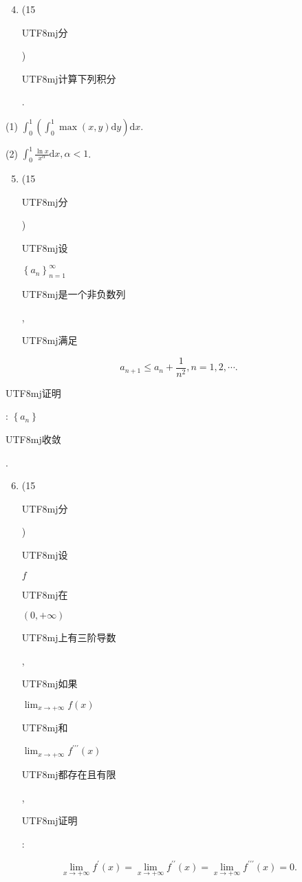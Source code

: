 \documentclass[10pt]{article}
\begin{document}
\begin{enumerate}
  \setcounter{enumi}{3}
  \item (15 \begin{CJK}{UTF8}{mj}分\end{CJK}) \begin{CJK}{UTF8}{mj}计算下列积分\end{CJK}.
\end{enumerate}
(1) $\int_{0}^{1}\left(\int_{0}^{1} \max (x, y) \mathrm{d} y\right) \mathrm{d} x$.

(2) $\int_{0}^{1} \frac{\ln x}{x^{\alpha}} \mathrm{d} x, \alpha<1$.

\begin{enumerate}
  \setcounter{enumi}{4}
  \item (15 \begin{CJK}{UTF8}{mj}分\end{CJK}) \begin{CJK}{UTF8}{mj}设\end{CJK} $\left\{a_{n}\right\}_{n=1}^{\infty}$ \begin{CJK}{UTF8}{mj}是一个非负数列\end{CJK}, \begin{CJK}{UTF8}{mj}满足\end{CJK}
\end{enumerate}
$$
a_{n+1} \leqslant a_{n}+\frac{1}{n^{2}}, n=1,2, \cdots .
$$
\begin{CJK}{UTF8}{mj}证明\end{CJK}: $\left\{a_{n}\right\}$ \begin{CJK}{UTF8}{mj}收敛\end{CJK}.

\begin{enumerate}
  \setcounter{enumi}{5}
  \item (15 \begin{CJK}{UTF8}{mj}分\end{CJK}) \begin{CJK}{UTF8}{mj}设\end{CJK} $f$ \begin{CJK}{UTF8}{mj}在\end{CJK} $(0,+\infty)$ \begin{CJK}{UTF8}{mj}上有三阶导数\end{CJK}, \begin{CJK}{UTF8}{mj}如果\end{CJK} $\lim _{x \rightarrow+\infty} f(x)$ \begin{CJK}{UTF8}{mj}和\end{CJK} $\lim _{x \rightarrow+\infty} f^{\prime \prime \prime}(x)$ \begin{CJK}{UTF8}{mj}都存在且有限\end{CJK}, \begin{CJK}{UTF8}{mj}证明\end{CJK}:
\end{enumerate}
$$
\lim _{x \rightarrow+\infty} f^{\prime}(x)=\lim _{x \rightarrow+\infty} f^{\prime \prime}(x)=\lim _{x \rightarrow+\infty} f^{\prime \prime \prime}(x)=0 .
$$
\end{document}
